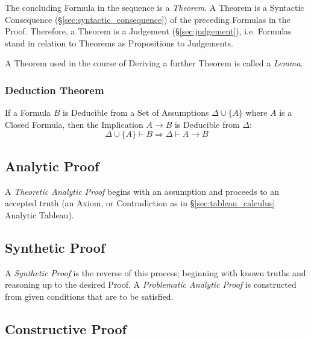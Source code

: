 The concluding Formula in the sequence is a \emph{Theorem}. A Theorem
is a Syntactic Consequence (\S\ref{sec:syntactic_consequence}) of the
preceding Formulas in the Proof. Therefore, a Theorem is a Judgement
(\S\ref{sec:judgement}), i.e. Formulas stand in relation to Theorems
as Propositions to Judgements. \cite{martinlof84}

A Theorem used in the course of Deriving a further Theorem is called a
\emph{Lemma}.



\subsubsection{Deduction Theorem}\label{sec:deduction_theorem}

If a Formula $B$ is Deducible from a Set of Assumptions $\Delta \cup
\{ A \}$ where $A$ is a Closed Formula, then the Implication $A
\rightarrow B$ is Deducible from $\Delta$:
\[
  \Delta \cup \{A\} \vdash B \Rightarrow \Delta \vdash A \rightarrow B
\]



\subsection{Analytic Proof}\label{sec:analytic_proof}

A \emph{Theoretic Analytic Proof} begins with an assumption and
proceeds to an accepted truth (an Axiom, or Contradiction as in
\S\ref{sec:tableau_calculus} Analytic Tableau).



\subsection{Synthetic Proof}\label{sec:synthetic_proof}

A \emph{Synthetic Proof} is the reverse of this process; beginning
with known truths and reasoning up to the desired Proof. A
\emph{Problematic Analytic Proof} is constructed from given conditions
that are to be satisfied.



\subsection{Constructive Proof}\label{sec:constructive_proof}

